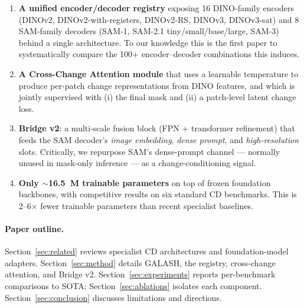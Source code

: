 \begin{enumerate}
  \item \textbf{A unified encoder/decoder registry} exposing 16 DINO-family
    encoders (DINOv2, DINOv2-with-registers, DINOv2-RS, DINOv3, DINOv3-sat)
    and 8 SAM-family decoders (SAM-1, SAM-2.1 tiny/small/base/large, SAM-3)
    behind a single architecture. To our knowledge this is the first paper to
    systematically compare the 100+ encoder--decoder combinations this
    induces.
  \item \textbf{A Cross-Change Attention module} that uses a learnable
    temperature to produce per-patch change representations from DINO features,
    and which is jointly supervised with (i) the final mask and (ii) a patch-level
    latent change loss.
  \item \textbf{Bridge v2}: a multi-scale fusion block (FPN + transformer
    refinement) that feeds the SAM decoder's \emph{image embedding}, \emph{dense
    prompt}, and \emph{high-resolution} slots. Critically, we repurpose SAM's
    dense-prompt channel --- normally unused in mask-only inference --- as a
    change-conditioning signal.
  \item \textbf{Only $\sim$16.5~M trainable parameters} on top of frozen
    foundation backbones, with competitive results on six standard CD
    benchmarks. This is 2--6$\times$ fewer trainable parameters than recent
    specialist baselines.
\end{enumerate}

\paragraph{Paper outline.} Section~\ref{sec:related} reviews specialist CD
architectures and foundation-model adapters. Section~\ref{sec:method} details
GALASH, the registry, cross-change attention, and Bridge v2.
Section~\ref{sec:experiments} reports per-benchmark comparisons to SOTA;
Section~\ref{sec:ablations} isolates each component. Section~\ref{sec:conclusion}
discusses limitations and directions.
